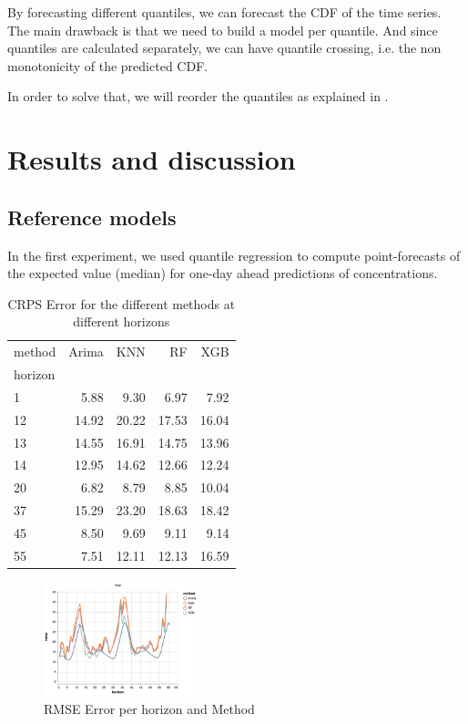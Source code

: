 \documentclass[a4paper,twocolumn,5p]{elsarticle}
\begin{document}
By forecasting different quantiles, we
can forecast the CDF of the time series. 
The main drawback is that we need to build a model per quantile. And since quantiles 
are calculated separately, 
we can have quantile crossing, i.e. the non monotonicity of the predicted CDF. 

In order to solve that, we will reorder the quantiles as explained in \cite{xgb}. 

\section{Results and discussion}
\label{sec:results}

\subsection{Reference models}
\label{sec:deterministic}

In the first experiment, we used quantile regression to compute
point-forecasts of the expected value (median) for one-day ahead
predictions of \no concentrations.

\begin{table}[tbp]
\caption{\label{tab:determ}CRPS Error for the different methods at different
horizons 
}
  \centering
  \begin{tabular}{lrrrr}
    \toprule
    method &  Arima &   KNN &    RF &   XGB \\
    horizon &        &       &       &       \\
    \midrule
    1       &   5.88 &  9.30 &  6.97 &  7.92 \\
    12      &  14.92 & 20.22 & 17.53 & 16.04 \\
    13      &  14.55 & 16.91 & 14.75 & 13.96 \\
    14      &  12.95 & 14.62 & 12.66 & 12.24 \\
    20      &   6.82 &  8.79 &  8.85 & 10.04 \\
    37      &  15.29 & 23.20 & 18.63 & 18.42 \\
    45      &   8.50 &  9.69 &  9.11 &  9.14 \\
    55      &   7.51 & 12.11 & 12.13 & 16.59 \\
    \bottomrule
    \end{tabular}
\end{table}


\begin{figure}
  \caption{RMSE Error per horizon and Method}
  \centering
      \includegraphics[width=0.4\textwidth]{results/rmse}
\end{figure}
\end{document}

